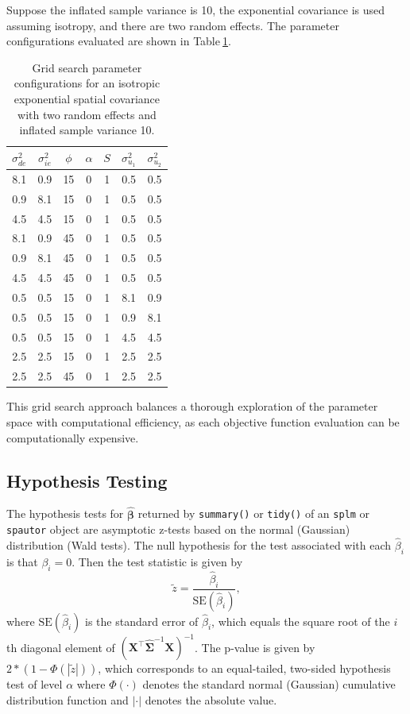 \documentclass{article}
\begin{document}
Suppose the inflated sample variance is 10, the exponential covariance
is used assuming isotropy, and there are two random effects. The
parameter configurations evaluated are shown in
Table\(~\)\ref{tab:grid2}.

\begin{table}
  \centering
  \begin{tabular}{ccccccc}
  \hline
  $\sigma^2_{de}$ & $\sigma^2_{ie}$ & $\phi$ & $\alpha$ & $S$ & $\sigma^2_{u_1}$ & $\sigma^2_{u_2}$ \\
  \hline
  8.1 & 0.9 & 15 & 0 & 1 & 0.5 & 0.5 \\
  0.9 & 8.1 & 15 & 0 & 1 & 0.5 & 0.5 \\
  4.5 & 4.5 & 15 & 0 & 1 & 0.5 & 0.5 \\
  8.1 & 0.9 & 45 & 0 & 1 & 0.5 & 0.5 \\
  0.9 & 8.1 & 45 & 0 & 1 & 0.5 & 0.5 \\
  4.5 & 4.5 & 45 & 0 & 1 & 0.5 & 0.5 \\
  0.5 & 0.5 & 15 & 0 & 1 & 8.1 & 0.9 \\
  0.5 & 0.5 & 15 & 0 & 1 & 0.9 & 8.1 \\
  0.5 & 0.5 & 15 & 0 & 1 & 4.5 & 4.5 \\
  2.5 & 2.5 & 15 & 0 & 1 & 2.5 & 2.5 \\
  2.5 & 2.5 & 45 & 0 & 1 & 2.5 & 2.5 \\
  \hline
  \end{tabular}
  \caption{Grid search parameter configurations for an isotropic exponential spatial covariance with two random effects and inflated sample variance 10.}
  \label{tab:grid2}
\end{table}

This grid search approach balances a thorough exploration of the
parameter space with computational efficiency, as each objective
function evaluation can be computationally expensive.

\hypertarget{hypothesis-testing}{%
\subsection{Hypothesis Testing}\label{hypothesis-testing}}

The hypothesis tests for \(\hat{\boldsymbol{\beta}}\) returned by
\texttt{summary()} or \texttt{tidy()} of an \texttt{splm} or
\texttt{spautor} object are asymptotic z-tests based on the normal
(Gaussian) distribution (Wald tests). The null hypothesis for the test
associated with each \(\hat{\beta}_i\) is that \(\beta_i = 0\). Then the
test statistic is given by \begin{equation*}
  \tilde{z} = \frac{\hat{\beta}_i}{\text{SE}(\hat{\beta}_i)},
\end{equation*} where \(\text{SE}(\hat{\beta}_i)\) is the standard error
of \(\hat{\beta}_i\), which equals the square root of the \(i\)th
diagonal element of
\((\mathbf{X}^\top \hat{\boldsymbol{\Sigma}}^{-1} \mathbf{X})^{-1}\).
The p-value is given by \(2 * (1 - \Phi(|\tilde{z}|))\), which
corresponds to an equal-tailed, two-sided hypothesis test of level
\(\alpha\) where \(\Phi(\cdot)\) denotes the standard normal (Gaussian)
cumulative distribution function and \(|\cdot|\) denotes the absolute
value.
\end{document}
